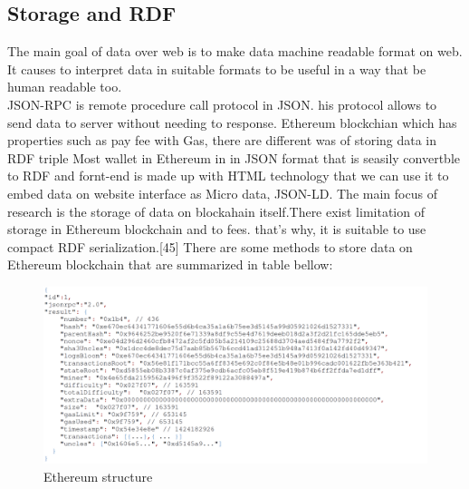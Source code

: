 \subsection{Storage and RDF}
The main goal of data over web is to make data machine readable format on web. It causes to interpret data in suitable formats to be useful in a way that be human readable too. \\
JSON-RPC is remote procedure call protocol in JSON. his protocol allows to send data to server without needing to response. 
Ethereum blockchian which has properties such as pay 
fee with Gas, there are different was of storing data in RDF triple
Most wallet in Ethereum in in JSON format that is seasily convertble to RDF and fornt-end is made up with HTML  technology that we can use it to embed data on website interface as Micro data, JSON-LD. The main focus of research is the storage of data on blockahain itself.There exist limitation of storage in Ethereum blockchain and to fees. that's why, it is suitable to use compact RDF serialization.[45] There are some methods to store data on Ethereum  blockchain that are summarized in table bellow:
\begin{center}
	\begin{figure}[htb!]
		
		\begin{minipage}{0.55\linewidth}
			\centering
			\includegraphics[width=1.95\textwidth]{images/chap02_Eth_str.png}
		\end{minipage}
		\caption[Ethreuem structure]{Ethereum structure}
		
	\end{figure}
	
\end{center}
